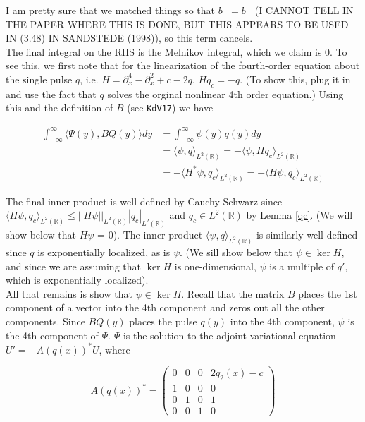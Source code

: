 \documentclass[12pt]{article}
\def\R{{\mathbb R}}
\begin{document}
I am pretty sure that we matched things so that $b^+ = b^-$ (I CANNOT TELL IN THE PAPER WHERE THIS IS DONE, BUT THIS APPEARS TO BE USED IN (3.48) IN SANDSTEDE (1998)), so this term cancels.\\

The final integral on the RHS is the Melnikov integral, which we claim is 0. To see this, we first note that for the linearization of the fourth-order equation about the single pulse $q$, i.e. $H = \partial_x^4 - \partial_x^2 + c - 2q$, $Hq_c = -q$. (To show this, plug it in and use the fact that $q$ solves the orginal nonlinear 4th order equation.) Using this and the definition of $B$ (see \texttt{KdV17}) we have

\begin{align*}
 \int_{-\infty}^\infty \langle \Psi(y), BQ(y) \rangle dy &=  \int_{-\infty}^\infty \psi(y) q(y) dy \\
&= \langle \psi, q \rangle_{L^2(\R)} = -\langle \psi, H q_c \rangle_{L^2(\R)} \\
&= -\langle H^* \psi, q_c\rangle_{L^2(\R)} = -\langle H \psi, q_c \rangle_{L^2(\R)}
\end{align*}

The final inner product is well-defined by Cauchy-Schwarz since $\langle H \psi, q_c \rangle_{L^2(\R)} \leq ||H \psi||_{L^2(\R)} |q_c|_{L^2(\R)}$ and $q_c \in L^2(\R)$ by Lemma \ref{qc}. (We will show below that $H \psi$ = 0). The inner product $\langle \psi, q \rangle_{L^2(\R)}$ is similarly well-defined since $q$ is exponentially localized, as is $\psi$. (We sill show below that $\psi \in \ker H$, and since we are assuming that $\ker H$ is one-dimensional, $\psi$ is a multiple of $q'$, which is exponentially localized).\\

All that remains is show that $\psi \in \ker H$. Recall that the matrix $B$ places the 1st component of a vector into the 4th component and zeros out all the other components. Since $BQ(y)$ places the pulse $q(y)$ into the 4th component, $\psi$ is the 4th component of $\Psi$. $\Psi$ is the solution to the adjoint variational equation $U' = -A(q(x))^*U$, where 

\[ 
A(q(x))^* = 
 \begin{pmatrix}0 & 0 & 0 & 2q_2(x) - c \\ 1 & 0 & 0 & 0 \\ 0 & 1 & 0 & 1 \\ 0 & 0 & 1 & 0\end{pmatrix}
\]
\end{document}
